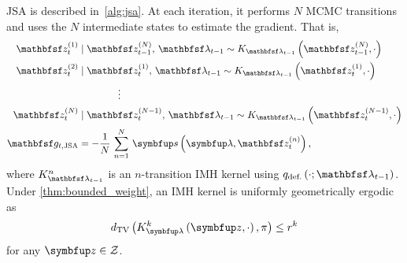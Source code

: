 \begin{proofEnd}

  JSA is described in~\cref{alg:jsa}. 
  At each iteration, it performs \(N\) MCMC transitions and uses the \(N\) intermediate states to estimate the gradient.
  That is,
  \begin{align*}
    \rvvz^{(1)}_{t} &\mid \rvvz_{t-1}^{(N)},\, \rvvlambda_{t-1} \sim K_{\rvvlambda_{t-1}}\left(\rvvz_{t-1}^{(N)}, \cdot\right) \\
    \rvvz^{(2)}_{t} &\mid \rvvz^{(1)}_{t},\, \rvvlambda_{t-1}  \sim K_{\rvvlambda_{t-1}}\left(\rvvz_{t}^{(1)}, \cdot\right) \\
    &\qquad\qquad\vdots
    \\
    \rvvz^{(N)}_{t} &\mid \rvvz^{(N-1)}_{t},\, \rvvlambda_{t-1}  \sim K_{\rvvlambda_{t-1}}\left(\rvvz_{t}^{(N-1)}, \cdot\right)
    \\
    \rvvg_{t,\text{JSA}}  &= -\frac{1}{N}\,\sum^{N}_{n=1} \, \vs\left(\vlambda, \rvvz^{(n)}_t\right),
  \end{align*}
  where \(K_{\rvvlambda_{t-1}}^n\) is an \(n\)-transition IMH kernel using \(q_{\text{def.}}\left(\cdot; \rvvlambda_{t-1}\right)\).
  Under \cref{thm:bounded_weight}, an IMH kernel is uniformly geometrically ergodic~\citep{10.2307/2242610, wang_exact_2022} as
  \begin{align}
    \DTV{K_{\vlambda}^k\left(\vz, \cdot\right)}{\pi} \leq r^{k}\label{eq:imh_ergodicity}
  \end{align}
  for any \(\vz \in \mathcal{Z}\).


\end{proofEnd}
